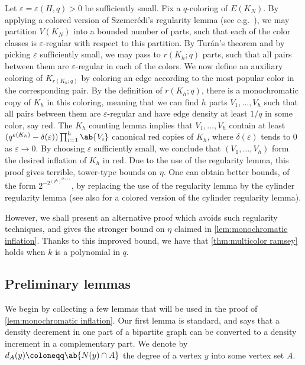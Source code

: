 Let $\varepsilon = \varepsilon(H,q)>0$ be sufficiently small. Fix a $q$-coloring of $E(K_N)$. By applying a colored version of Szemer\'edi's regularity lemma (see e.g.\ \cite[Theorem 1.18]{MR1395865}), we may partition $V(K_N)$ into a bounded number of parts, such that each of the color classes is $\varepsilon$-regular with respect to this partition. By Tur\'an's theorem and by picking $\varepsilon$ sufficiently small, we may pass to $r(K_h;q)$ parts, such that all pairs between them are $\varepsilon$-regular in each of the colors. We now define an auxiliary coloring of $K_{r(K_h;q)}$ by coloring an edge according to the most popular color in the corresponding pair. By the definition of $r(K_h;q)$, there is a monochromatic copy of $K_h$ in this coloring, meaning that we can find $h$ parts $V_1,\dots,V_h$ such that all pairs between them are $\varepsilon$-regular and have edge density at least $1/q$ in some color, say red. The $K_h$ counting lemma implies that $V_1,\dots,V_h$ contain at least $(q^{e(K_h)}-\delta(\varepsilon))\prod_{i=1}^h \ab{V_i}$ canonical red copies of $K_h$, where $\delta(\varepsilon)$ tends to $0$ as $\varepsilon \to 0$. By choosing $\varepsilon$ sufficiently small, we conclude that $(V_1,\dots,V_h)$ form the desired inflation of $K_h$ in red. Due to the use of the regularity lemma, this proof gives terrible, tower-type bounds on $\eta$. One can obtain better bounds, of the form $2^{-2^{(qh)^{O(1)}}}$, by replacing the use of the regularity lemma by the cylinder regularity lemma \cite{MR1333857} (see also \cite{MR4170446} for a colored version of the cylinder regularity lemma).


However, we shall present an alternative proof which avoids such regularity techniques, and gives the stronger bound on $\eta$ claimed in \cref{lem:monochromatic inflation}. Thanks to this improved bound, we have that \cref{thm:multicolor ramsey} holds when $k$ is a polynomial in $q$.


\subsection{Preliminary lemmas}
We begin by collecting a few lemmas that will be used in the proof of \cref{lem:monochromatic inflation}.
 Our first lemma is standard, and says that a density decrement in one part of a bipartite graph can be converted to a density increment in a complementary part.
 We denote by $d_{A}(y) \coloneqq \ab{N(y) \cap A}$ the degree of a vertex $y$ into some vertex set $A$.


